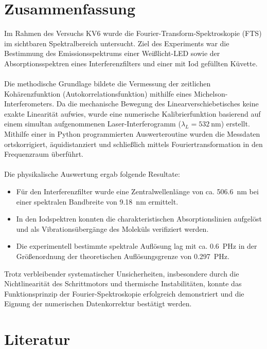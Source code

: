\documentclass[10pt,a4paper]{article}
\begin{document}
\section{Zusammenfassung}

Im Rahmen des Versuchs KV6 wurde die Fourier-Transform-Spektroskopie (FTS) im sichtbaren Spektralbereich untersucht. Ziel des Experiments war die Bestimmung des Emissionsspektrums einer Weißlicht-LED sowie der Absorptionsspektren eines Interferenzfilters und einer mit Iod gefüllten Küvette.\\\\
Die methodische Grundlage bildete die Vermessung der zeitlichen Kohärenzfunktion (Autokorrelationsfunktion) mithilfe eines Michelson-Interferometers. Da die mechanische Bewegung des Linearverschiebetisches keine exakte Linearität aufwies, wurde eine numerische Kalibrierfunktion basierend auf einem simultan aufgenommenen Laser-Interferogramm ($\lambda_L=\qty{532}{\nm}$) erstellt. Mithilfe einer in Python programmierten Auswerteroutine wurden die Messdaten ortskorrigiert, äquidistanziert und schließlich mittels Fouriertransformation in den Frequenzraum überführt.\\\\
Die physikalische Auswertung ergab folgende Resultate:
\begin{itemize}
       \item Für den Interferenzfilter wurde eine Zentralwellenlänge von ca. \qty{506,6}{\nm} bei einer spektralen Bandbreite von \qty{9,18}{\nm} ermittelt.
       \item In den Iodspektren konnten die charakteristischen Absorptionslinien aufgelöst und als Vibrationsübergänge des Moleküls verifiziert werden.
       \item Die experimentell bestimmte spektrale Auflösung lag mit ca. \qty{0,6}{\peta\hertz} in der Größenordnung der theoretischen Auflösungsgrenze von \qty{0,297}{\peta\hertz}.
\end{itemize}
Trotz verbleibender systematischer Unsicherheiten, insbesondere durch die Nichtlinearität des Schrittmotors und thermische Instabilitäten, konnte das Funktionsprinzip der Fourier-Spektroskopie erfolgreich demonstriert und die Eignung der numerischen Datenkorrektur bestätigt werden.

\newpage
{}


\section{Literatur}
\thispagestyle{empty}



\newpage

\listoffigures %
\end{document}
